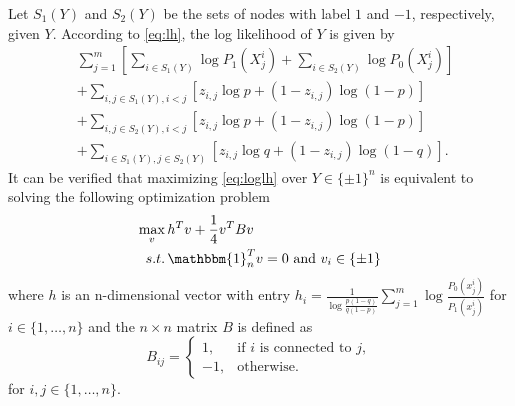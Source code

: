 \documentclass[conference]{IEEEtran}
\begin{document}
	Let $S_1(Y)$ and $S_2(Y)$ be the sets of nodes with label $1$ and $-1$, respectively, given $Y$.
	According to \eqref{eq:lh}, the log likelihood of $Y$ is given by
	\begin{align}\label{eq:loglh}
		&\sum^m_{j=1}[\sum_{i\in S_1(Y)} \log P_1(X^i_{j})+\sum_{i\in S_2(Y)} \log P_0(X^i_{j})]\nonumber\\
		&+\sum_{i,j\in S_1(Y),i<j}[z_{i,j}\log p+(1-z_{i,j})\log (1-p)]\nonumber\\
		&+\sum_{i,j\in S_2(Y),i<j}[z_{i,j}\log p+(1-z_{i,j})\log (1-p)]
		\nonumber\\
		&+\sum_{i\in S_1(Y),j\in S_2(Y)}[z_{i,j}\log q+(1-z_{i,j})\log (1-q)].
	\end{align}
	It can be verified that maximizing \eqref{eq:loglh} over $Y\in\{\pm 1\}^n$ is equivalent to solving the following optimization problem
	\begin{align}
		\max_{v}\, & h^T v + \frac{1}{4}v^T B v \notag \\
		s.t.\, & \mathbbm{1}_n^T v = 0 \text{ and } v_i \in \{\pm 1 \} \label{eq:matrix_mle}
	\end{align}
	where $h$ is an n-dimensional vector with entry $h_i = \frac{1}{\log \frac{p(1-q)}{q(1-p)}}\sum_{j=1}^m \log \frac{P_0(x^i_{j})}{P_1(x^i_{j})}$ for $i\in\{1,\ldots,n\}$ and the $n\times n $ matrix $B$ is defined as
	\begin{equation}
		B_{ij} = \begin{cases}
			1, & \text{if $i$ is connected to $j$}, \\
			-1,& \text{otherwise.}
		\end{cases}
	\end{equation}  
	for $i,j\in\{1,\ldots,n\}$.
	
\end{document}
